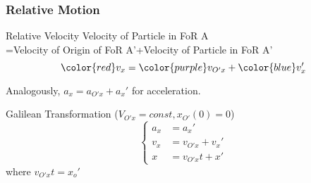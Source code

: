 \begin{frame}
\frametitle{Relative Motion}
\begin{block}{Relative Velocity}
{\color{red}Velocity of Particle in FoR A}\\={\color{purple}Velocity of Origin of FoR A'}+{\color{blue}Velocity of Particle in FoR A'}
\[{\color{red}v_{x}}={\color{purple}v_{O'x}}+{\color{blue}v_{x}'}\]
\end{block}
Analogously, $a_{x}=a_{O'x}+a_{x}'$ for acceleration.
\begin{block}{Galilean Transformation ($V_{O'x}=const, x_{O'}(0)=0$)}
\[
\begin{cases}
a_{x}&=a_{x}'\\
v_{x}&=v_{O'x}+v_{x}'\\
x&=v_{O'x}t+x'
\end{cases}
\]
where $v_{O'x}t=x_{o}'$
\end{block}
\end{frame}
